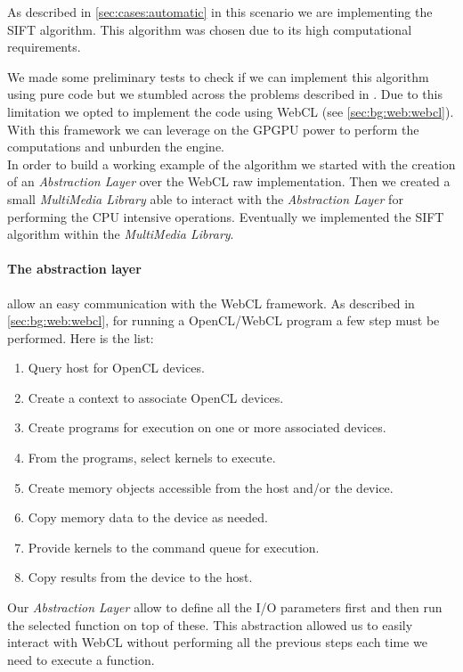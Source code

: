 As described in \ref{sec:cases:automatic} in this
scenario we are implementing the \acf{SIFT} algorithm. This algorithm
was chosen due to its high computational requirements.

We made some preliminary tests to check if we can implement this algorithm using
pure \js{} code but we stumbled across the problems described in
. Due to this limitation we opted to implement the
code using \ac{WebCL} (see \ref{sec:bg:web:webcl}). With this framework we can
leverage on the \ac{GPGPU} power to perform the computations and unburden the
\js{} engine.\\ 

In order to build a working example of the algorithm we started with the creation
of an \emph{Abstraction Layer} over the \ac{WebCL} raw implementation. Then we created
a small \emph{MultiMedia Library} able to interact with the \emph{Abstraction
Layer} for performing the CPU intensive operations. Eventually we implemented the
\ac{SIFT} algorithm within the \emph{MultiMedia Library}.

\paragraph{The abstraction layer} allow an easy communication with the \ac{WebCL}
framework. As described in \ref{sec:bg:web:webcl}, for running a OpenCL/WebCL
program a few step must be performed. Here is the list:
\begin{enumerate}
    \item Query host for \ac{OpenCL} devices.
    \item Create a context to associate \ac{OpenCL} devices.
    \item Create programs for execution on one or more associated devices.
    \item From the programs, select kernels to execute.
    \item Create memory objects accessible from the host and/or the device.
    \item Copy memory data to the device as needed.
    \item Provide kernels to the command queue for execution.
    \item Copy results from the device to the host.
\end{enumerate}
\noindent Our \emph{Abstraction Layer} allow to define all the I/O parameters
first and then run the selected  function on top of these. This abstraction
allowed us to easily interact with \ac{WebCL} without performing all the previous
steps each time we need to execute a  function.


